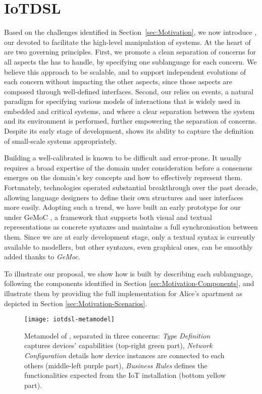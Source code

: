 \section{IoTDSL}
\label{sec:IoTDSL}

Based on the challenges identified in Section~\ref{sec:Motivation}, we now introduce \IOTDSL, our \DSL devoted to facilitate the high-level manipulation of \IOT systems. At the heart of \IOTDSL are two governing principles. First, we promote a clean separation of concerns for all aspects the \DSL has to handle, by specifying one sublanguage for each concern. We believe this approach to be scalable, and to support independent evolutions of each concern without impacting the other aspects, since those aspects are composed through well-defined interfaces. Second, our \DSL relies on events, a natural paradigm for specifying various models of interactions that is widely used in embedded and critical systems, and where a clear separation between the system and its environment is performed, further empowering the separation of concerns. Despite its early stage of development, \IOTDSL shows its ability to capture the definition of small-scale \IOT systems appropriately.

Building a well-calibrated \DSL is known to be difficult and error-prone. It usually requires a broad expertise of the domain under consideration before a consensus emerges on the domain's key concepts and how to effectively represent them. Fortunately, \MDE technologies operated substantial breakthrough over the past decade, allowing language designers to define their own \DSL structures and user interfaces more easily. Adopting such a trend, we have built an early prototype for our \DSL under GeMoC \cite[\url{http://gemoc.org}]{bousse-16}, a \MDE framework that supports both visual and textual representations as concrete syntaxes and maintains a full synchronisation between them. Since we are at early development stage, only a textual syntax is currently available to modellers, but other syntaxes, even graphical ones, can be smoothly added thanks to \textit{GeMoc}.

To illustrate our proposal, we show how \IOTDSL is built by describing each sublanguage, following the \DSL components identified in Section \ref{sec:Motivation-Components}, and illustrate them by providing the full implementation for Alice's apartment as depicted in Section \ref{sec:Motivation-Scenarios}.

\begin{figure*}%
  \centering  
  \texttt{[image: iotdsl-metamodel]}%
  \caption{Metamodel of \IOTDSL, separated in three concerns: \emph{Type Definition} captures devices' capabilities (top-right green part), \emph{Network Configuration} details how device instances are connected to each others (middle-left purple part), \emph{Business Rules} defines the functionalities expected from the IoT installation (bottom yellow part).}%
  \label{fig:IoTDevice-MM}%
\end{figure*}






